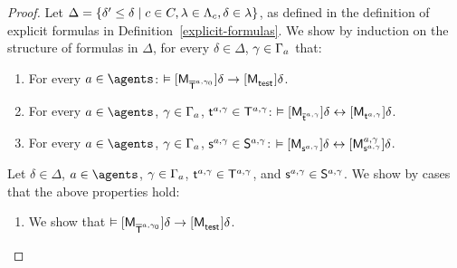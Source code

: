 \begin{proof}

Let $\Delta = \{\delta' \leq \delta \mid \agentC \in \agentsC, \lambda \in \Lambda_\agentC, \delta \in \lambda\}$, as defined in the definition of explicit formulas in Definition~\ref{explicit-formulas}.
We show by induction on the structure of formulas in $\Delta$, for every $\delta \in \Delta$, $\gamma \in \Gamma_\agentA$ that:

\begin{enumerate}
    \item For every $\agentA \in \agents$: $\entails \actionA{\aPModel{\aPStatesT[\agentA, \gamma_0]}} \delta \implies \actionA{\aPModel{\aStateTest}} \delta$.
    \item For every $\agentA \in \agents$, $\gamma \in \Gamma_\agentA$, $\aStateT[\agentA, \gamma] \in \aStatesT[\agentA, \gamma]$: $\entails \actionA{\aPModel{\aPStateT[\agentA, \gamma]}} \delta \iff \actionA{\aPModel{\aStateT[\agentA, \gamma]}} \delta$.
    \item For every $\agentA \in \agents$, $\gamma \in \Gamma_\agentA$, $\aStateS[\agentA, \gamma] \in \aStates[\agentA, \gamma]$: $\entails \actionA{\aPModel{\aStateS[\agentA, \gamma]}} \delta \iff \actionA{\aPModel[\agentA, \gamma]{\aStateS[\agentA, \gamma]}} \delta$.
\end{enumerate}

Let $\delta \in \Delta$, $\agentA \in \agents$, $\gamma \in \Gamma_\agentA$, $\aStateT[\agentA, \gamma] \in \aStatesT[\agentA, \gamma]$, and $\aStateS[\agentA, \gamma] \in \aStates[\agentA, \gamma]$.
We show by cases that the above properties hold:

\begin{enumerate}
    \item We show that $\entails \actionA{\aPModel{\aPStatesT[\agentA, \gamma_0]}} \delta \implies \actionA{\aPModel{\aStateTest}} \delta$.


\end{enumerate}
\end{proof}
